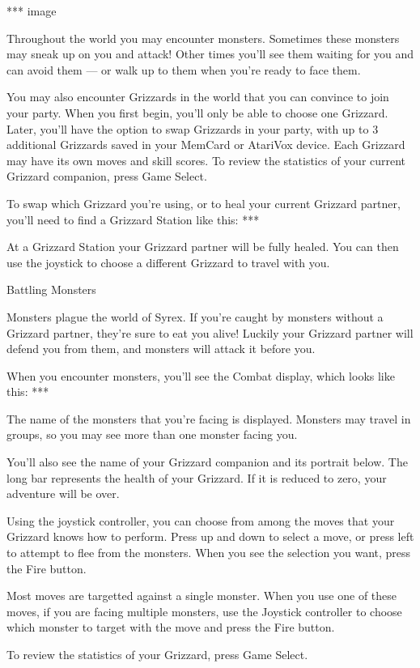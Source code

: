 \documentclass[10pt,twoside,openright]{memoir}
\begin{document}
*** image

Throughout the world you may encounter monsters. Sometimes these monsters
may sneak up on you and attack! Other times you'll see them waiting for you
and can avoid them --- or walk up to them when you're ready to face them.

You may also encounter Grizzards in the world that you can convince to join
your party. When you first begin, you'll only be able to choose one
Grizzard. Later, you'll have the option to swap Grizzards in your party,
with up to 3 additional Grizzards saved in your MemCard or AtariVox device.
Each Grizzard may have its own moves and skill scores. To review the
statistics of your current Grizzard companion, press Game Select.

To swap which Grizzard you're using, or to heal your current Grizzard
partner, you'll need to find a Grizzard Station like this: ***

At a Grizzard Station your Grizzard partner will be fully healed. You can
then use the joystick to choose a different Grizzard to travel with you.


Battling Monsters

Monsters plague the world of Syrex. If you're caught by monsters without a
Grizzard partner, they're sure to eat you alive! Luckily your Grizzard
partner will defend you from them, and monsters will attack it before you.

When you encounter monsters, you'll see the Combat display, which looks like
this: ***

The name of the monsters that you're facing is displayed. Monsters may
travel in groups, so you may see more than one monster facing you.

You'll also see the name of your Grizzard companion and its portrait below.
The long bar represents the health of your Grizzard. If it is reduced to
zero, your adventure will be over.

Using the joystick controller, you can choose from among the moves that your
Grizzard knows how to perform. Press up and down to select a move, or press
left to attempt to flee from the monsters. When you see the selection you
want, press the Fire button.

Most moves are targetted against a single monster.  When you use one of
these moves, if you are facing multiple monsters, use the Joystick
controller to choose which monster to target with the move and press the
Fire button.

To review the statistics of your Grizzard, press Game Select.
\end{document}
